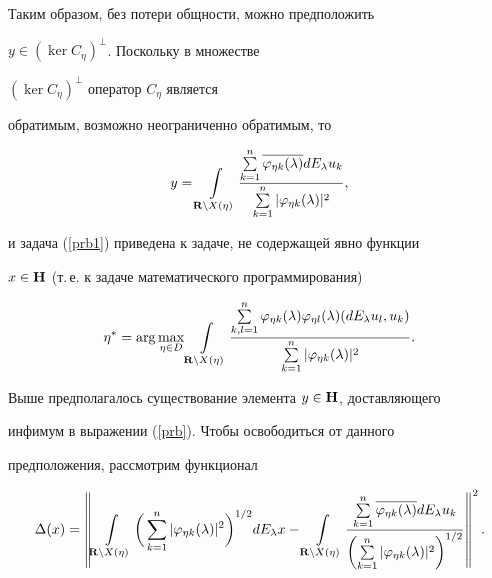 Таким образом, без потери общности, можно предположить


$y\in ( \ker C_\eta )^{\bot }$. Поскольку в множестве


$( \ker C_\eta )^{\bot }$ оператор $C_\eta $ является


обратимым, возможно неограниченно обратимым, то 


$$


y=\int\limits_{{\bold R}\setminus X( \eta ) }\frac{


\sum\limits_{k=1}^n\overline{\varphi_{\eta k}( \lambda ) }


dE_\lambda u_k}{\sum\limits_{k=1}^n| \varphi_{\eta k}( \lambda


) |^2}, 


$$


и задача (\ref{prb1}) приведена к задаче, не содержащей явно функции


$x\in {\bold H}$ (т.\,е. к задаче математического программирования)


\begin{equation}


\label{prb2}


\eta^{*}=\arg \max_{\eta \in D}\int\limits_{{\bold R}\setminus


X( \eta ) }\frac{\sum\limits_{k,l=1}^n\varphi_{\eta k}(


\lambda ) \varphi_{\eta l}( \lambda ) ( dE_\lambda


u_l,u_k) }{\sum\limits_{k=1}^n| \varphi_{\eta k}( \lambda


) |^2}.


\end{equation}





Выше предполагалось существование элемента $y\in {\bold H}$, доставляющего 


инфимум в выражении (\ref{prb}). Чтобы освободиться от данного


предположения, рассмотрим функционал


\begin{equation}


\label{delta}


\Delta ( x) =\left\| \int\limits_{{\bold R}


\setminus X( \eta ) }\bigg( \sum_{k=1}^n| \varphi_{\eta


k}( \lambda ) |^2\bigg)^{1/2}dE_\lambda


x-\int\limits_{{\bold R}\setminus X( \eta ) }\frac{


\sum\limits_{k=1}^n\overline{\varphi_{\eta k}( \lambda ) }


dE_\lambda u_k }{\left( \sum\limits_{k=1}^n| \varphi_{\eta k}(


\lambda ) |^2\right)^{1/2}}\right\|^2. 


\end{equation}


